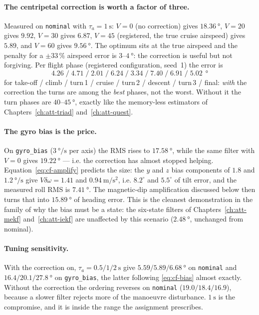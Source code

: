 \paragraph{The centripetal correction is worth a factor of three.} Measured on \texttt{nominal}
with $\tau_a=\SI{1}{\second}$: $V=0$ (no correction) gives $\SI{18.36}{\degree}$, $V=20$ gives
$9.92$, $V=30$ gives $6.87$, $V=45$ (registered, the true cruise airspeed) gives $5.89$, and
$V=60$ gives $\SI{9.56}{\degree}$. The optimum sits at the true airspeed and the penalty for a
$\pm33\,\%$ airspeed error is $3$--$\SI{4}{\degree}$: the correction is useful but not forgiving.
Per flight phase (registered configuration, seed~1) the error is
\[
4.26\;/\;4.71\;/\;2.01\;/\;6.24\;/\;3.34\;/\;7.40\;/\;6.91\;/\;5.02\ \SI{}{\degree}
\]
for take-off / climb / turn\,1 / cruise / turn\,2 / descent / turn\,3 / final: \emph{with} the
correction the turns are among the \emph{best} phases, not the worst. Without it the turn phases are
$40$--$\SI{45}{\degree}$, exactly like the memory-less estimators of Chapters~\ref{ch:att-triad}
and~\ref{ch:att-quest}.

\paragraph{The gyro bias is the price.} On \texttt{gyro\_bias} ($\SI{3}{\degree\per\second}$ per
axis) the RMS rises to $\SI{17.58}{\degree}$, while the same filter with $V=0$ gives
$\SI{19.22}{\degree}$ --- i.e. the correction has almost stopped helping.
Equation~\eqref{eq:cf-amplify} predicts the size: the $y$ and $z$ bias components of $1.8$ and
$\SI{1.2}{\degree\per\second}$ give $V\delta\omega=1.41$ and
$\SI{0.94}{\metre\per\second\squared}$, i.e. $8.2^\circ$ and $5.5^\circ$ of tilt error, and the
measured roll RMS is $\SI{7.41}{\degree}$. The magnetic-dip amplification discussed below then
turns that into $\SI{15.89}{\degree}$ of heading error. This is the cleanest demonstration in the
family of why the bias must be a state: the six-state filters of Chapters~\ref{ch:att-mekf}
and~\ref{ch:att-iekf} are unaffected by this scenario ($\SI{2.48}{\degree}$, unchanged from
nominal).

\paragraph{Tuning sensitivity.} With the correction on, $\tau_a=0.5/1/\SI{2}{\second}$ give
$5.59/5.89/\SI{6.68}{\degree}$ on \texttt{nominal} and $16.4/20.1/\SI{27.8}{\degree}$ on
\texttt{gyro\_bias}, the latter following \eqref{eq:cf-bias} almost exactly. Without the correction
the ordering reverses on \texttt{nominal} ($19.0/18.4/16.9$), because a slower filter rejects more
of the manoeuvre disturbance. $\SI{1}{\second}$ is the compromise, and it is inside the range the
assignment prescribes.

